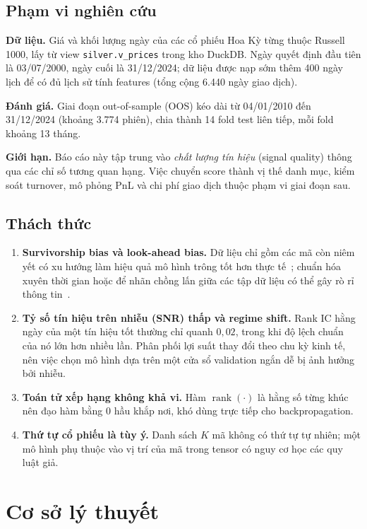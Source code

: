 \documentclass[a4paper,12pt]{article}
\DeclareMathOperator{\rk}{rank}
\begin{document}
\subsection{Phạm vi nghiên cứu}
\textbf{Dữ liệu.} Giá và khối lượng ngày của các cổ phiếu Hoa Kỳ từng thuộc Russell 1000, lấy từ view \texttt{silver.v\_prices} trong kho DuckDB. Ngày quyết định đầu tiên là 03/07/2000, ngày cuối là 31/12/2024; dữ liệu được nạp sớm thêm 400 ngày lịch để có đủ lịch sử tính features (tổng cộng 6.440 ngày giao dịch).

\textbf{Đánh giá.} Giai đoạn out-of-sample (OOS) kéo dài từ 04/01/2010 đến 31/12/2024 (khoảng 3.774 phiên), chia thành 14 fold test liên tiếp, mỗi fold khoảng 13 tháng.

\textbf{Giới hạn.} Báo cáo này tập trung vào \emph{chất lượng tín hiệu} (signal quality) thông qua các chỉ số tương quan hạng. Việc chuyển score thành vị thế danh mục, kiểm soát turnover, mô phỏng PnL và chi phí giao dịch thuộc phạm vi giai đoạn sau.

\subsection{Thách thức}
\begin{enumerate}
    \item \textbf{Survivorship bias và look-ahead bias.} Dữ liệu chỉ gồm các mã còn niêm yết có xu hướng làm hiệu quả mô hình trông tốt hơn thực tế~\cite{Brown1992}; chuẩn hóa xuyên thời gian hoặc để nhãn chồng lấn giữa các tập dữ liệu có thể gây rò rỉ thông tin~\cite{LopezdePrado2018}.
    \item \textbf{Tỷ số tín hiệu trên nhiễu (SNR) thấp và regime shift.} Rank IC hằng ngày của một tín hiệu tốt thường chỉ quanh $0{,}02$, trong khi độ lệch chuẩn của nó lớn hơn nhiều lần. Phân phối lợi suất thay đổi theo chu kỳ kinh tế, nên việc chọn mô hình dựa trên một cửa sổ validation ngắn dễ bị ảnh hưởng bởi nhiễu.
    \item \textbf{Toán tử xếp hạng không khả vi.} Hàm $\rk(\cdot)$ là hằng số từng khúc nên đạo hàm bằng $0$ hầu khắp nơi, khó dùng trực tiếp cho backpropagation.
    \item \textbf{Thứ tự cổ phiếu là tùy ý.} Danh sách $K$ mã không có thứ tự tự nhiên; một mô hình phụ thuộc vào vị trí của mã trong tensor có nguy cơ học các quy luật giả.
\end{enumerate}

\newpage
\section{Cơ sở lý thuyết}\label{sec:background}
\end{document}
